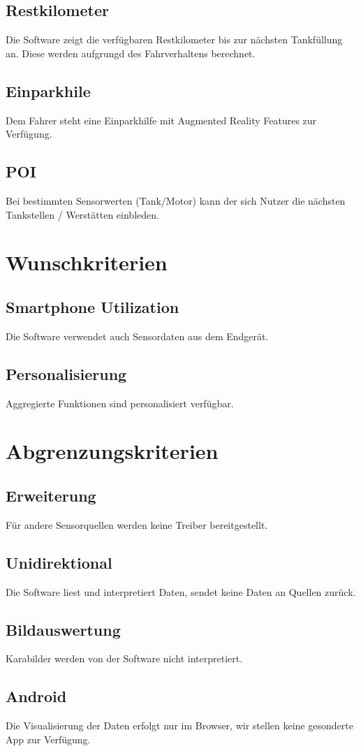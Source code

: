 \documentclass[pflichtenheft.tex]{subfiles}
\begin{document}
\subsection{\mknr Restkilometer} Die Software zeigt die verfügbaren Restkilometer bis zur nächsten Tankfüllung an. Diese werden aufgrungd des Fahrverhaltens berechnet.

\subsection{\mknr Einparkhile} Dem Fahrer steht eine Einparkhilfe mit Augmented Reality Features zur Verfügung.

\subsection{\mknr POI} Bei bestimmten Sensorwerten (Tank/Motor) kann der sich Nutzer die nächsten Tankstellen / Werstätten einbleden.


\section{Wunschkriterien}


\subsection{\mknr Smartphone Utilization} Die Software verwendet auch Sensordaten aus dem Endgerät.

\subsection{\mknr Personalisierung} Aggregierte Funktionen sind personalisiert verfügbar.

\section{Abgrenzungskriterien}

\subsection{\mknr Erweiterung} Für andere Sensorquellen werden keine Treiber bereitgestellt.

\subsection{\mknr Unidirektional} Die Software liest und interpretiert Daten, sendet keine Daten an Quellen zurück.

\subsection{\mknr Bildauswertung} Karabilder werden von der Software nicht interpretiert.

\subsection{\mknr Android} Die Visualisierung der Daten erfolgt nur im Browser, wir stellen keine gesonderte App zur Verfügung.
\end{document}
